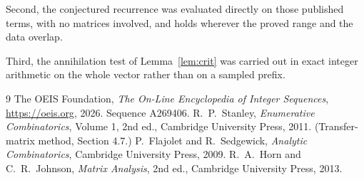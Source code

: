 \documentclass[11pt,a4paper]{article}
\theoremstyle{plain}
\theoremstyle{definition}
\begin{document}
Second, the conjectured recurrence was evaluated directly on those published terms, with no
matrices involved, and holds wherever the proved range and the data overlap.

Third, the annihilation test of Lemma~\ref{lem:crit} was carried out in exact integer
arithmetic on the whole vector rather than on a sampled prefix.

\begin{thebibliography}{9}
 The OEIS Foundation, \emph{The On-Line Encyclopedia of Integer
Sequences}, \url{https://oeis.org}, 2026. Sequence A269406.
 R.~P.~Stanley, \emph{Enumerative Combinatorics}, Volume 1, 2nd ed.,
Cambridge University Press, 2011. (Transfer-matrix method, Section 4.7.)
 P.~Flajolet and R.~Sedgewick, \emph{Analytic Combinatorics}, Cambridge
University Press, 2009.
 R.~A.~Horn and C.~R.~Johnson, \emph{Matrix Analysis}, 2nd ed., Cambridge
University Press, 2013.
\end{thebibliography}
\end{document}
